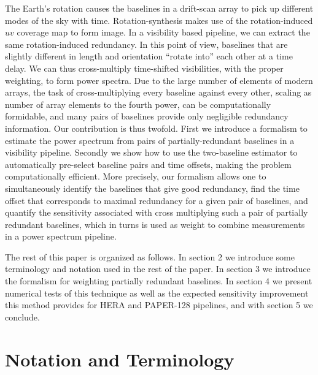 \documentclass[twocolumn,apj,numberedappendix]{emulateapj}
\renewcommand\[{\begin{equation}}
\renewcommand\]{\end{equation}}
\begin{document}
The Earth's rotation causes the baselines in a drift-scan array to pick up different modes of the sky with time. Rotation-synthesis makes use of the rotation-induced $uv$ coverage map to form image. In a visibility based pipeline, we can extract the same rotation-induced redundancy. In this point of view, baselines that are slightly different in length and orientation
``rotate into'' each other at a time delay. We can thus cross-multiply time-shifted visibilities, with the proper weighting, to form power spectra.  Due to the large number of elements of modern arrays, the task of cross-multiplying every baseline against every other, scaling as number of array elements to the fourth power, can be computationally formidable, and many pairs of baselines provide only negligible redundancy information. Our contribution is thus twofold. First we introduce a formalism to estimate the power spectrum from pairs of partially-redundant baselines in a visibility pipeline. Secondly we show how to use the two-baseline estimator to automatically pre-select baseline pairs and time offsets, making the problem computationally efficient. More precisely, our formalism allows one to simultaneously identify the baselines that give good
redundancy, find the time offset that corresponds to maximal redundancy for a given pair of baselines, and quantify the sensitivity associated with cross multiplying
such a pair of partially redundant baselines, which in turns is used as weight to combine measurements in a power spectrum pipeline. 




The rest of this paper is organized as follows. In section 2 we introduce some terminology and notation used in the rest of the paper. In section
3 we introduce the formalism for weighting partially redundant baselines.
In section 4 we present numerical tests of
this technique as well as the expected sensitivity improvement
 this method provides for HERA and PAPER-128 pipelines, and with section 5 we conclude. 

\section{Notation and Terminology}
\end{document}
